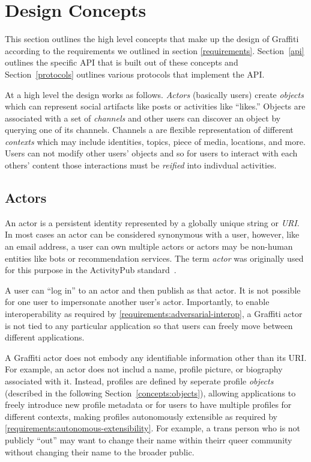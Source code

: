 \section{Design Concepts}

This section outlines the high level concepts that make up the design of Graffiti
according to the requirements we outlined in section \ref{requirements}.
Section~\ref{api} outlines the specific API that is built out of these
concepts and Section~\ref{protocols} outlines various protocols that implement the API.

At a high level the design works as follows.
\emph{Actors} (basically users) create \emph{objects} which can represent
social artifacts like posts or activities like ``likes.''
Objects are associated with a set of \emph{channels} and other users can
discover an object by querying one of its channels. Channels a are flexible representation
of different \emph{contexts} which may include identities, topics, piece of media, locations,
and more.
Users can not modify other users' objects and so for users to interact with each others' content
those interactions must be \emph{reified} into indivdual
activities.

\subsection{Actors}

An actor is a persistent identity represented by a globally unique string or \emph{URI}.
In most cases an actor can be considered synonymous with a user,
however, like an email address, a user can own multiple actors
or actors may be non-human entities like bots or recommendation services.
The term \emph{actor} was originally used for this purpose
in the ActivityPub standard~\cite{activitypub}.

A user can ``log in'' to an actor and then publish as that actor.
It is not possible for one user to impersonate another user's actor.
Importantly, to enable interoperability
as required by \ref{requirements:adversarial-interop},
a Graffiti actor is not tied to any particular application so that users can freely move between
different applications.

A Graffiti actor does not embody any identifiable information other than its
URI. For example, an actor does not includ a
name, profile picture, or biography associated with it.
Instead, profiles are defined by seperate profile \emph{objects}
(described in the following Section~\ref{concepts:objects}),
allowing applications to freely introduce new profile
metadata or for users to have multiple profiles for different contexts,
making profiles autonomously extensible as required by \ref{requirements:autonomous-extensibility}.
For example, a trans person who is not publicly ``out'' may want to
change their name within theirr queer community without
changing their name to the broader public.

